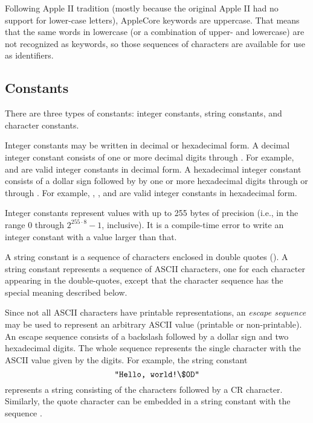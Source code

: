 \documentclass[10pt]{article}
\begin{document}
Following Apple II tradition (mostly because the original Apple II had
no support for lower-case letters), AppleCore keywords are uppercase.
That means that the same words in lowercase (or a combination of
upper- and lowercase) are not recognized as keywords, so those
sequences of characters are available for use as identifiers.

\subsection{Constants}
\label{sec:lexical:constants}

There are three types of constants: integer constants, string
constants, and character constants.  

  Integer constants may be written in
decimal or hexadecimal form.  A decimal integer constant consists of
one or more decimal digits  through .  For example,
 and  are valid integer constants in decimal form.  A
hexadecimal integer constant consists of a dollar sign \kwd{\$}
followed by by one or more hexadecimal digits  through 
or  through .  For example, , , and
 are valid integer constants in hexadecimal form.

Integer constants represent values with up to 255 bytes of precision
(i.e., in the range $0$ through $2^{255 \cdot 8}-1$, inclusive).  It
is a compile-time error to write an integer constant with a value
larger than that.

 A string constant is a sequence of
characters enclosed in double quotes ().  A string constant
represents a sequence of ASCII characters, one for each character
appearing in the double-quotes, except that the character sequence
\kwd{\bs\$} has the special meaning described below.

Since not all ASCII characters have printable representations, an
\emph{escape sequence} may be used to represent an arbitrary ASCII
value (printable or non-printable).  An escape sequence consists of a
backslash \kwd{\bs} followed by a dollar sign \kwd{\$} and two
hexadecimal digits.  The whole sequence represents the single
character with the ASCII value given by the digits.  For example, the
string constant
%
$$\texttt{"Hello, world!\textbackslash\$0D"}$$
%
represents a string consisting of the characters 
followed by a CR character.  Similarly, the quote character 
can be embedded in a string constant with the sequence .
\end{document}
